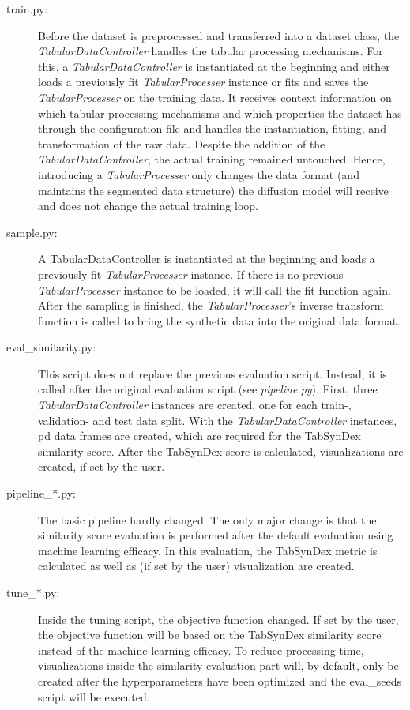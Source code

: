 \begin{description}
	\item[train.py:]
		Before the dataset is preprocessed and transferred into a dataset class, the \textit{TabularDataController} handles the tabular processing mechanisms.
		For this, a \textit{TabularDataController} is instantiated at the beginning and either loads a previously fit \textit{TabularProcesser} instance or fits and saves the \textit{TabularProcesser} on the training data.
		It receives context information on which tabular processing mechanisms and which properties the dataset has through the configuration file and handles the
		instantiation, fitting, and transformation of the raw data.
		Despite the addition of the \textit{TabularDataController}, the actual training remained untouched.
		Hence, introducing a \textit{TabularProcesser} only changes the data format (and maintains the segmented data structure) the diffusion \gls{model} will receive and does not change the actual training loop.

	\item[sample.py:]
		A TabularDataController is instantiated at the beginning and loads a previously fit \textit{TabularProcesser} instance.
		If there is no previous \textit{TabularProcesser} instance to be loaded, it will call the fit function again.
		After the sampling is finished, the \textit{TabularProcesser}'s inverse transform function is called to bring the synthetic data into the original data format.

	\item[eval\_similarity.py:]
		This script does not replace the previous evaluation script.
		Instead, it is called after the original evaluation script (see \textit{pipeline.py}).
		First, three \textit{TabularDataController} instances are created, one for each train-, validation- and test data split.
		With the \textit{TabularDataController} instances, \gls{pd} \cite{mckinney-proc-scipy-2010} data frames are created, which are required for the TabSynDex similarity score.
		After the TabSynDex score is calculated, visualizations are created, if set by the user.
	\newpage
	\item[pipeline\_*.py:]
		The basic pipeline hardly changed.
		The only major change is that the similarity score evaluation is performed after the default evaluation using machine learning efficacy.
		In this evaluation, the TabSynDex metric is calculated as well as (if set by the user) visualization are created.

	\item[tune\_*.py:]
		Inside the tuning script, the objective function changed.
		If set by the user, the objective function will be based on the TabSynDex similarity score instead of the machine learning efficacy.
		To reduce processing time, visualizations inside the similarity evaluation part will, by default, only be created after the hyperparameters have been optimized and the eval\_seeds script will be executed.


\end{description}

